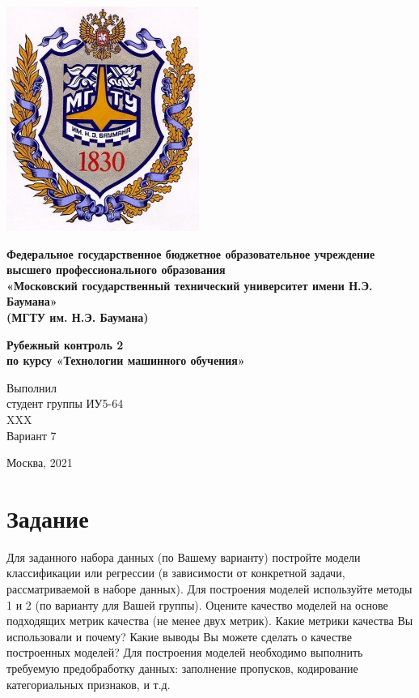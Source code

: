 \documentclass[a4paper]{article}
\begin{document}
  \fontsize{14}{16}\selectfont

  \begin{titlepage}
    \begin{minipage}{0.2\textwidth}
      \includegraphics[scale=0.4]{logo}
    \end{minipage}
    \begin{minipage}{0.7\textwidth}\centering
      \fontsize{10}{12}\selectfont
      \textbf{
        Федеральное государственное бюджетное образовательное учреждение \\
        высшего профессионального образования \\
        «Московский государственный технический университет имени Н.Э. Баумана» \\
        (МГТУ им. Н.Э. Баумана)
      }
    \end{minipage}

    \vspace{5cm}
    \centering
    \textbf{
      Рубежный контроль 2 \\
      по курсу «Технологии машинного обучения» \\
    }

    \vspace{5cm}
    \begin{flushright}
    Выполнил \\
    студент группы ИУ5-64 \\
    XXX \\
    Вариант 7
    \end{flushright}
    \vspace*{\fill}
    Москва, 2021
  \end{titlepage}

  \section*{Задание}
  Для заданного набора данных (по Вашему варианту) постройте модели
  классификации или регрессии (в зависимости от конкретной
  задачи, рассматриваемой в наборе данных). Для построения
  моделей используйте методы 1 и 2 (по варианту для Вашей группы).
  Оцените качество моделей на основе подходящих метрик качества
  (не менее двух метрик). Какие метрики качества Вы использовали
  и почему? Какие выводы Вы можете сделать о качестве построенных
  моделей? Для построения моделей необходимо выполнить требуемую
  предобработку данных: заполнение пропусков, кодирование
  категориальных признаков, и т.д.
\end{document}
